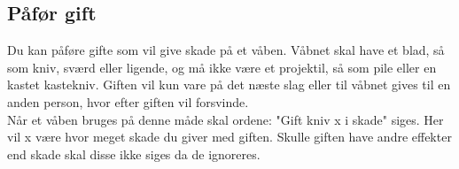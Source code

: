 \subsection*{Påfør gift}
Du kan påføre gifte som vil give skade på et våben. Våbnet skal have et blad, så som kniv, sværd eller ligende, og må ikke være et projektil, så som pile eller en kastet kastekniv. Giften vil kun vare på det næste slag eller til våbnet gives til en anden person, hvor efter giften vil forsvinde.\\
Når et våben bruges på denne måde skal ordene: "Gift kniv x i skade" siges. Her vil x være hvor meget skade du giver med giften. Skulle giften have andre effekter end skade skal disse ikke siges da de ignoreres.